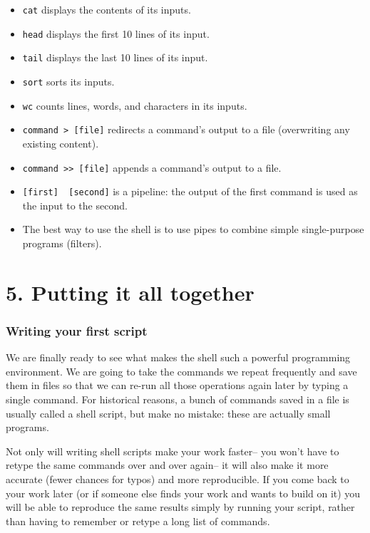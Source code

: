 \documentclass[
]{book}
\providecommand{\tightlist}{%
  \setlength{\itemsep}{0pt}\setlength{\parskip}{0pt}}
\begin{document}
\begin{itemize}
\tightlist
\item
  \texttt{cat} displays the contents of its inputs.
\item
  \texttt{head} displays the first 10 lines of its input.
\item
  \texttt{tail} displays the last 10 lines of its input.
\item
  \texttt{sort} sorts its inputs.
\item
  \texttt{wc} counts lines, words, and characters in its inputs.
\item
  \texttt{command\ \textgreater{}\ {[}file{]}} redirects a command's output to a file (overwriting any existing content).
\item
  \texttt{command\ \textgreater{}\textgreater{}\ {[}file{]}} appends a command's output to a file.
\item
  \texttt{{[}first{]}\ \textbar{}\ {[}second{]}} is a pipeline: the output of the first command is used as the input to the second.
\item
  The best way to use the shell is to use pipes to combine simple single-purpose programs (filters).
\end{itemize}

\chapter{5. Putting it all together}\label{putting-it-all-together}

\subsection{Writing your first script}\label{writing-your-first-script}

We are finally ready to see what makes the shell such a powerful programming environment. We are going to take the commands we repeat frequently and save them in files so that we can re-run all those operations again later by typing a single command. For historical reasons, a bunch of commands saved in a file is usually called a shell script, but make no mistake: these are actually small programs.

Not only will writing shell scripts make your work faster-- you won't have to retype the same commands over and over again-- it will also make it more accurate (fewer chances for typos) and more reproducible. If you come back to your work later (or if someone else finds your work and wants to build on it) you will be able to reproduce the same results simply by running your script, rather than having to remember or retype a long list of commands.
\end{document}
